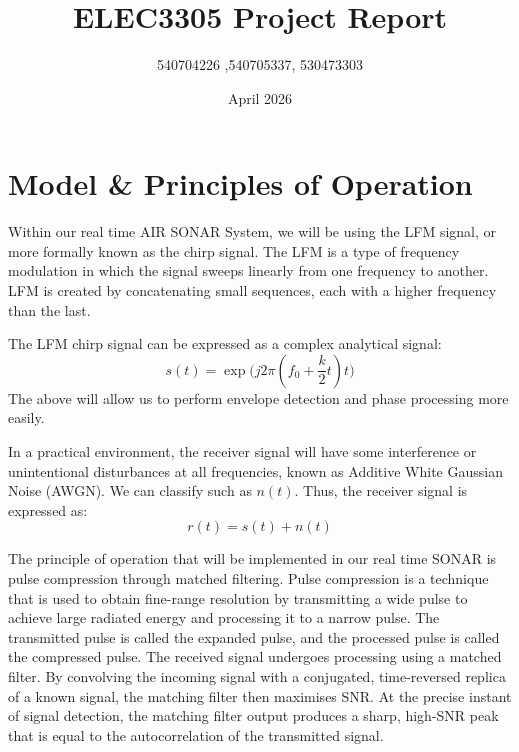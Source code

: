 \documentclass[11pt, a4paper]{article}
\title{\textbf{ELEC3305 Project Report}}
\author{540704226 ,540705337, 530473303}
\date{April 2026}
\begin{document}
\maketitle

\section{Model \& Principles of Operation}

Within our real time AIR SONAR System, we will be using the LFM signal, or more formally known as the chirp signal. The LFM is a type of frequency modulation in which the signal sweeps linearly from one frequency to another. LFM is created by concatenating small sequences, each with a higher frequency than the last.

\vspace{1\baselineskip}

\noindent The LFM chirp signal can be expressed as a complex analytical signal:
\[
s(t) = \exp\bigl(j 2\pi (f_0 + \frac{k}{2}t)t\bigr)
\]
The above will allow us to perform envelope detection and phase processing more easily.

\vspace{1\baselineskip}

\noindent In a practical environment, the receiver signal will have some interference or unintentional disturbances at all frequencies, known as Additive White Gaussian Noise (AWGN). We can classify such as $n(t)$. Thus, the receiver signal is expressed as:
\[
r(t) = s(t) + n(t)
\]

\vspace{1\baselineskip}

\noindent The principle of operation that will be implemented in our real time SONAR is pulse compression through matched filtering. Pulse compression is a technique that is used to obtain fine-range resolution by transmitting a wide pulse to achieve large radiated energy and processing it to a narrow pulse. The transmitted pulse is called the expanded pulse, and the processed pulse is called the compressed pulse. The received signal undergoes processing using a matched filter. By convolving the incoming signal with a conjugated, time-reversed replica of a known signal, the matching filter then maximises SNR. At the precise instant of signal detection, the matching filter output produces a sharp, high-SNR peak that is equal to the autocorrelation of the transmitted signal.

\vspace{1\baselineskip}
\end{document}
